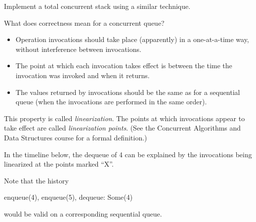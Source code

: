 
\begin{slide}

Implement a total concurrent stack using a similar technique.
\end{slide}


\begin{slide}

What does correctness mean for a concurrent queue?
\begin{itemize}
\item Operation invocations should take place (apparently) in a one-at-a-time
  way, without interference between invocations.

\item The point at which each invocation takes effect is between the time the
invocation was invoked and when it returns.  

\item The values returned by invocations should be the same as for a sequential
queue (when the invocations are performed in the same order). 
\end{itemize}

This property is called \emph{linearization}.  The points at which invocations
appear to take effect are called \emph{linearization points}.  (See the
Concurrent Algorithms and Data Structures course for a formal definition.)
\end{slide}





\begin{slide}

In the timeline below, the dequeue of 4 can be explained by the invocations
being linearized at the points marked ``X''.
%
\unScalaMid
{}


Note that the history
\begin{scala}
  enqueue(4), enqueue(5), dequeue: Some(4)
\end{scala}
would be valid on a corresponding sequential queue. 
\end{slide}

